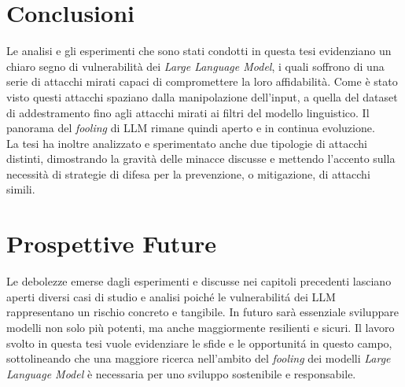 \section{Conclusioni}
Le analisi e gli esperimenti che sono stati condotti in questa tesi evidenziano un chiaro segno di vulnerabilit\`a dei \emph{Large Language Model}, i quali soffrono di una serie di attacchi mirati capaci di compromettere la loro affidabilit\`a. Come \`e stato visto questi attacchi spaziano dalla manipolazione dell'input, a quella del dataset di addestramento fino agli attacchi mirati ai filtri del modello linguistico. Il panorama del \emph{fooling} di LLM rimane quindi aperto e in continua evoluzione.\\
La tesi ha inoltre analizzato e sperimentato anche due tipologie di attacchi distinti, dimostrando la gravit\`a delle minacce discusse e mettendo l'accento sulla necessit\`a di strategie di difesa per la prevenzione, o mitigazione, di attacchi simili.

\section{Prospettive Future}
Le debolezze emerse dagli esperimenti e discusse nei capitoli precedenti lasciano aperti diversi casi di studio e analisi poich\'e le vulnerabilit\'a dei LLM rappresentano un rischio concreto e tangibile. In futuro sar\`a essenziale sviluppare modelli non solo pi\`u potenti, ma anche maggiormente resilienti e sicuri. Il lavoro svolto in questa tesi vuole evidenziare le sfide e le opportunit\'a in questo campo, sottolineando che una maggiore ricerca nell'ambito del \emph{fooling} dei modelli \emph{Large Language Model} \`e necessaria per uno sviluppo sostenibile e responsabile.
